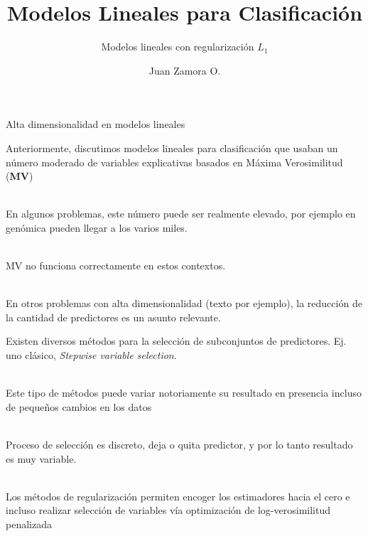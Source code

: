 \documentclass[]{beamer}
\title{Modelos Lineales para Clasificación}
\subtitle{Modelos lineales con regularización $L_1$}
\author{Juan Zamora O.}
\date{}
\begin{document}
\begin{frame}
    \titlepage
\end{frame}

\begin{frame}{Alta dimensionalidad en modelos lineales}



	Anteriormente, discutimos modelos lineales para clasificación que usaban un número moderado de variables explicativas basados en 
	Máxima Verosimilitud (\textbf{MV})\\~\
	
	En algunos problemas, este número puede ser realmente elevado, por ejemplo en genómica pueden llegar a los varios miles.\\~\
	
	MV no funciona correctamente en estos contextos.\\~\ 
	
	En otros problemas con alta dimensionalidad (texto por ejemplo), la reducción de la cantidad de predictores es un asunto relevante.
\end{frame}

\begin{frame}
	Existen diversos métodos para la selección de subconjuntos de predictores. Ej. uno clásico, \textit{Stepwise variable selection}.\\~\ 
	
	Este tipo de métodos puede variar notoriamente su resultado en presencia incluso de pequeños cambios en los datos\\~\ 
	

Proceso de selección es discreto, deja o quita predictor, y por lo tanto resultado es muy variable.\\~\

	
	Los métodos de regularización permiten encoger los estimadores hacia el cero e incluso realizar selección de variables vía optimización 
	de log-verosimilitud penalizada
	
\end{frame}
\end{document}
